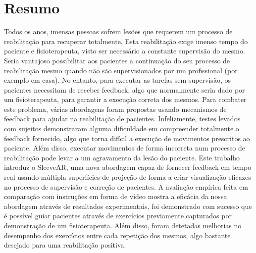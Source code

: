 \cleardoublepage




\chapter*{Resumo}
\thispagestyle{empty}

 
Todos os anos, imensas pessoas sofrem les\~oes que requerem um processo de reabilita\c{c}\~ao para recuperar totalmente.  
Esta reabilita\c{c}\~ao exige imenso tempo do paciente e fisioterapeuta, visto ser necess\'ario a constante supervis\~ao do mesmo. 
Seria vantajoso possibilitar aos pacientes a continua\c{c}\~ao do seu processo de reabilita\c{c}\~ao mesmo quando n\~ao s\~ao supervisionados por um profissional (por exemplo em casa). 
No entanto, para executar as tarefas sem supervis\~ao, os pacientes necessitam de receber feedback, algo que normalmente seria dado por um fisioterapeuta, para garantir a execu\c{c}\~ao correta dos mesmos.
Para combater este problema, v\'arias abordagens foram propostas usando mecanismos de feedback para ajudar na reabilita\c{c}\~ao de pacientes. Infelizmente, testes levados com sujeitos demonstraram alguma dificuldade em compreender totalmente o feedback fornecido, algo que torna dif\'icil a execu\c{c}\~ao de movimentos prescritos ao paciente. Al\'em disso, executar movimentos de forma incorreta num processo de reabilita\c{c}\~ao pode levar a um agravamento da les\~ao do paciente. Este trabalho introduz o SleeveAR,  uma nova abordagem capaz de fornecer feedback em tempo real usando m\'ultipla superf\'icies de proje\c{c}\~ao de forma a criar visualiza\c{c}\~ao eficazes no processo de supervis\~ao e corre\c{c}\~ao de pacientes.
A avalia\c{c}\~ao emp\'irica feita em compara\c{c}\~ao com instru\c{c}\~oes em forma de v\'ideo mostra a efic\'acia da nossa abordagem atrav\'es de resultados experimentais, foi demonstrado com sucesso que \'e poss\'ivel guiar pacientes atrav\'es de exerc\'icios previamente capturados por demonstra\c{c}\~ao de um fisioterapeuta. Al\'em disso, foram detetadas melhorias no desempenho dos exerc\'icios entre cada repeti\c{c}\~ao dos mesmos, algo bastante desejado para uma reabilita\c{c}\~ao positiva.


\newpage


